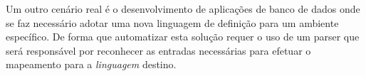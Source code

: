 Um outro cenário real é o desenvolvimento de aplicações de banco de dados onde se faz necessário adotar 
uma nova linguagem de definição para um ambiente específico. De forma que automatizar esta solução requer o uso de um 
parser que será responsável por reconhecer as entradas necessárias para efetuar o mapeamento 
para a \emph{linguagem} destino.








 
